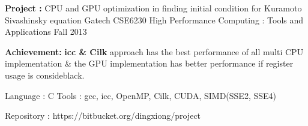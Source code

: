 \begin{cventries}
\cvproject
{\textbf{Project :} CPU and GPU optimization in finding initial 
  condition for Kuramoto Sivashinsky equation} 
{Gatech CSE6230 High Performance Computing : Tools and Applications} 
{Fall 2013} %
{
  \begin{cvitems}
  \item {\textbf{Achievement: }
      \textbf{icc \& Cilk} approach has the best performance of all multi CPU implementation \quad \& \quad
      the GPU implementation has better performance if register usage is consideblack.
    }
  \item {Language : C \quad 
      Tools :  gcc, icc, OpenMP, Cilk, CUDA, SIMD(SSE2, SSE4)
    }
  \item {
      Repository : {\color{black} https://bitbucket.org/dingxiong/project}
    }
  \end{cvitems}
}







\end{cventries}